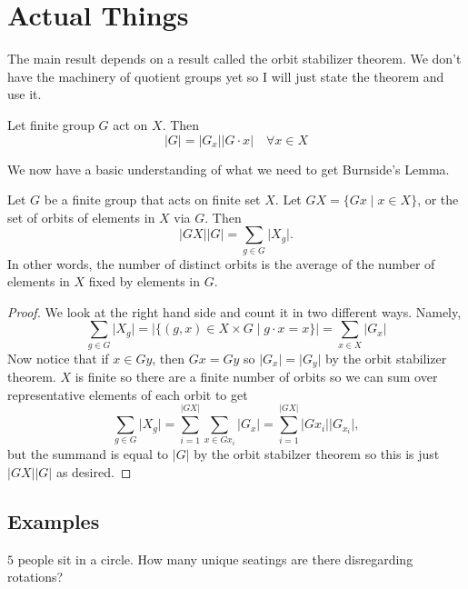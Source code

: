 \documentclass{article}
\begin{document}
\section{Actual Things}
The main result depends on a result called the orbit stabilizer theorem.
We don't have the machinery of quotient groups yet so I will just state
the theorem and use it.

\begin{thm}
Let finite group $G$ act on $X$. Then
\[ \lvert G \rvert = \lvert G_x \rvert \lvert G \cdot x \rvert \quad
\forall x \in X \]
\end{thm}

We now have a basic understanding of what we need to get Burnside's
Lemma.

\begin{lem}
Let $G$ be a finite group that acts on finite set $X$. Let $GX = \lbrace
Gx \mid x \in X \rbrace$, or the set of orbits of elements in $X$ via
$G$. Then
\[ \lvert GX \rvert \lvert G \rvert = \sum_{g \in G} \lvert X_g \rvert.
\]
In other words, the number of distinct orbits is the average of the
number of elements in $X$ fixed by elements in $G$.
\end{lem}

\begin{proof}
We look at the right hand side and count it in two different ways.
Namely,
\[ \sum_{g \in G} \lvert X_g \rvert = \lvert \lbrace (g, x) \in X \times
G \mid g \cdot x = x \rbrace \rvert = \sum_{x \in X} \lvert G_x \rvert
\]
Now notice that if $x \in Gy$, then $Gx = Gy$ so $\lvert G_x \rvert =
\lvert G_y \rvert$ by the orbit stabilizer theorem. $X$ is finite so
there are a finite number of orbits so we can sum over representative
elements of each orbit to get
\[ \sum_{g \in G} \lvert X_g \rvert = \sum_{i = 1}^{\lvert GX \rvert}
\sum_{x \in Gx_i} \lvert G_x \rvert = \sum_{i = 1}^{\lvert GX \rvert}
\lvert Gx_i \rvert \lvert G_{x_i} \rvert, \]
but the summand is equal to $\lvert G \rvert$ by the orbit stabilzer
theorem so this is just $\lvert GX \rvert \lvert G \rvert$ as desired.
\end{proof}

\subsection{Examples}

\begin{ex}
$5$ people sit in a circle. How many unique seatings are there
disregarding rotations?
\end{ex}
\end{document}
